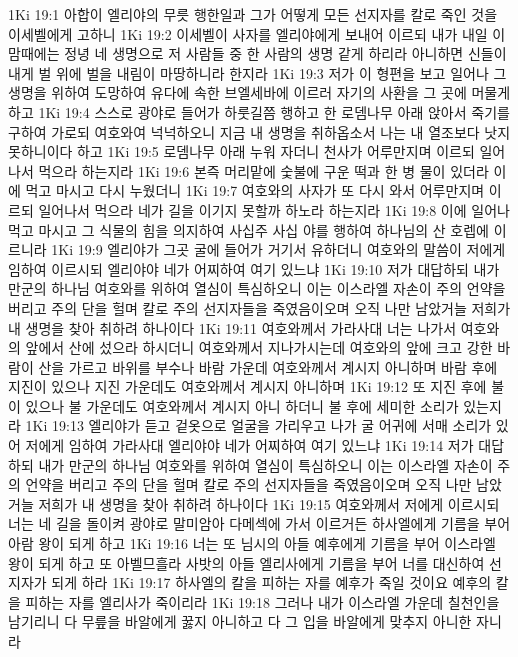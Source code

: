 1Ki 19:1  아합이 엘리야의 무릇 행한일과 그가 어떻게 모든 선지자를 칼로 죽인 것을 이세벨에게 고하니
1Ki 19:2  이세벨이 사자를 엘리야에게 보내어 이르되 내가 내일 이맘때에는 정녕 네 생명으로 저 사람들 중 한 사람의 생명 같게 하리라 아니하면 신들이 내게 벌 위에 벌을 내림이 마땅하니라 한지라
1Ki 19:3  저가 이 형편을 보고 일어나 그 생명을 위하여 도망하여 유다에 속한 브엘세바에 이르러 자기의 사환을 그 곳에 머물게 하고
1Ki 19:4  스스로 광야로 들어가 하룻길쯤 행하고 한 로뎀나무 아래 앉아서 죽기를 구하여 가로되 여호와여 넉넉하오니 지금 내 생명을 취하옵소서 나는 내 열조보다 낫지 못하니이다 하고
1Ki 19:5  로뎀나무 아래 누워 자더니 천사가 어루만지며 이르되 일어나서 먹으라 하는지라
1Ki 19:6  본즉 머리맡에 숯불에 구운 떡과 한 병 물이 있더라 이에 먹고 마시고 다시 누웠더니
1Ki 19:7  여호와의 사자가 또 다시 와서 어루만지며 이르되 일어나서 먹으라 네가 길을 이기지 못할까 하노라 하는지라
1Ki 19:8  이에 일어나 먹고 마시고 그 식물의 힘을 의지하여 사십주 사십 야를 행하여 하나님의 산 호렙에 이르니라
1Ki 19:9  엘리야가 그곳 굴에 들어가 거기서 유하더니 여호와의 말씀이 저에게 임하여 이르시되 엘리야야 네가 어찌하여 여기 있느냐
1Ki 19:10  저가 대답하되 내가 만군의 하나님 여호와를 위하여 열심이 특심하오니 이는 이스라엘 자손이 주의 언약을 버리고 주의 단을 헐며 칼로 주의 선지자들을 죽였음이오며 오직 나만 남았거늘 저희가 내 생명을 찾아 취하려 하나이다
1Ki 19:11  여호와께서 가라사대 너는 나가서 여호와의 앞에서 산에 섰으라 하시더니 여호와께서 지나가시는데 여호와의 앞에 크고 강한 바람이 산을 가르고 바위를 부수나 바람 가운데 여호와께서 계시지 아니하며 바람 후에 지진이 있으나 지진 가운데도 여호와께서 계시지 아니하며
1Ki 19:12  또 지진 후에 불이 있으나 불 가운데도 여호와께서 계시지 아니 하더니 불 후에 세미한 소리가 있는지라
1Ki 19:13  엘리야가 듣고 겉옷으로 얼굴을 가리우고 나가 굴 어귀에 서매 소리가 있어 저에게 임하여 가라사대 엘리야야 네가 어찌하여 여기 있느냐
1Ki 19:14  저가 대답하되 내가 만군의 하나님 여호와를 위하여 열심이 특심하오니 이는 이스라엘 자손이 주의 언약을 버리고 주의 단을 헐며 칼로 주의 선지자들을 죽였음이오며 오직 나만 남았거늘 저희가 내 생명을 찾아 취하려 하나이다
1Ki 19:15  여호와께서 저에게 이르시되 너는 네 길을 돌이켜 광야로 말미암아 다메섹에 가서 이르거든 하사엘에게 기름을 부어 아람 왕이 되게 하고
1Ki 19:16  너는 또 님시의 아들 예후에게 기름을 부어 이스라엘 왕이 되게 하고 또 아벨므흘라 사밧의 아들 엘리사에게 기름을 부어 너를 대신하여 선지자가 되게 하라
1Ki 19:17  하사엘의 칼을 피하는 자를 예후가 죽일 것이요 예후의 칼을 피하는 자를 엘리사가 죽이리라
1Ki 19:18  그러나 내가 이스라엘 가운데 칠천인을 남기리니 다 무릎을 바알에게 꿇지 아니하고 다 그 입을 바알에게 맞추지 아니한 자니라
